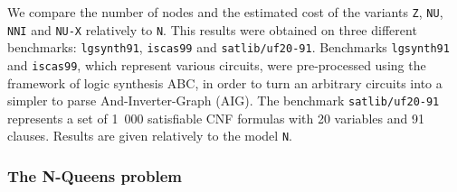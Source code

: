 \documentclass[a4paper,10pt]{article}
\begin{document}
We compare the number of nodes and the estimated cost of the variants \texttt{Z}, \texttt{NU}, \texttt{NNI} and \texttt{NU-X} relatively to \texttt{N}.
This results were obtained on three different benchmarks: \texttt{lgsynth91}\cite{BenchLgsynth91}, \texttt{iscas99}\cite{BenchIscas99} and \texttt{satlib/uf20-91}\cite{BenchSatlib}.
Benchmarks \texttt{lgsynth91} and \texttt{iscas99}, which represent various circuits, were pre-processed using the framework of logic synthesis ABC\cite{Abc}, in order to turn an arbitrary circuits into a simpler to parse And-Inverter-Graph (AIG).
The benchmark \texttt{satlib/uf20-91} represents a set of 1~000 satisfiable CNF formulas with 20 variables and 91 clauses.
Results are given relatively to the model \texttt{N}.


\subsubsection{The N-Queens problem}
\end{document}
